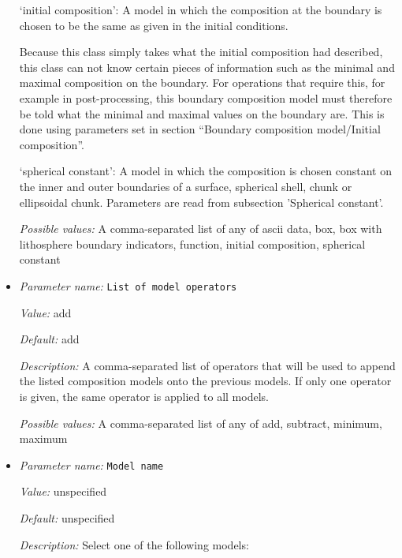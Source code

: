 \begin{itemize}
`initial composition': A model in which the composition at the boundary is chosen to be the same as given in the initial conditions.

Because this class simply takes what the initial composition had described, this class can not know certain pieces of information such as the minimal and maximal composition on the boundary. For operations that require this, for example in post-processing, this boundary composition model must therefore be told what the minimal and maximal values on the boundary are. This is done using parameters set in section ``Boundary composition model/Initial composition''.

`spherical constant': A model in which the composition is chosen constant on the inner and outer boundaries of a surface, spherical shell, chunk or ellipsoidal chunk. Parameters are read from subsection 'Spherical constant'.


{\it Possible values:} A comma-separated list of any of ascii data, box, box with lithosphere boundary indicators, function, initial composition, spherical constant
\item {\it Parameter name:} {\tt List of model operators}
\label{parameters:Boundary composition model/List of model operators}


{\it Value:} add


{\it Default:} add


{\it Description:} A comma-separated list of operators that will be used to append the listed composition models onto the previous models. If only one operator is given, the same operator is applied to all models.


{\it Possible values:} A comma-separated list of any of add, subtract, minimum, maximum
\item {\it Parameter name:} {\tt Model name}
\label{parameters:Boundary composition model/Model name}


{\it Value:} unspecified


{\it Default:} unspecified


{\it Description:} Select one of the following models:


\end{itemize}
